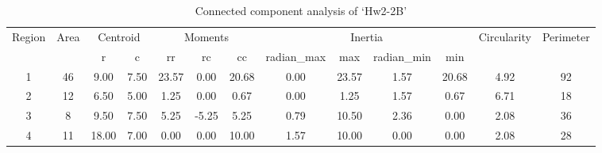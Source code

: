 \documentclass[a4paper]{article}
\begin{document}
\begin{table}[p]
	\centering
	\caption{Connected component analysis of `Hw2-2B'}
	\begin{tabular}{|c|c|c|c|c|c|c|c|c|c|c|c|c|}
		\hline
		\multirow{2}[4]{*}{Region} & \multirow{2}[4]{*}{Area} & \multicolumn{2}{c|}{Centroid} & \multicolumn{3}{c|}{Moments} & \multicolumn{4}{c|}{Inertia}  & \multirow{2}[4]{*}{Circularity} & \multirow{2}[4]{*}{Perimeter} \bigstrut\\
		\cline{3-11}          &       & r     & c     & rr    & rc    & cc    & radian\_max & max   & radian\_min & min   &       &  \bigstrut\\
		\hline
		1     & 46    & 9.00  & 7.50  & 23.57  & 0.00  & 20.68  & 0.00  & 23.57  & 1.57  & 20.68  & 4.92  & 92 \bigstrut\\
		\hline
		2     & 12    & 6.50  & 5.00  & 1.25  & 0.00  & 0.67  & 0.00  & 1.25  & 1.57  & 0.67  & 6.71  & 18 \bigstrut\\
		\hline
		3     & 8     & 9.50  & 7.50  & 5.25  & -5.25  & 5.25  & 0.79  & 10.50  & 2.36  & 0.00  & 2.08  & 36 \bigstrut\\
		\hline
		4     & 11    & 18.00  & 7.00  & 0.00  & 0.00  & 10.00  & 1.57  & 10.00  & 0.00  & 0.00  & 2.08  & 28 \bigstrut\\
		\hline
	\end{tabular}%
	\label{table:Hw2-2B analysis}%
	
\end{table}%
\end{document}
